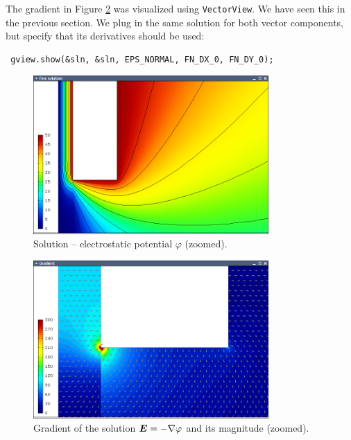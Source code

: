 \documentclass[11pt]{article}
\newcommand{\bfE}{\mbox{\boldmath $E$}}
\begin{document}
The gradient in Figure \ref{fig:motor-grad} was visualized using {\tt VectorView}. We have
seen this in the previous section. We plug in the same solution for both vector
components, but specify that its derivatives should be used:
\begin{lstlisting}
 gview.show(&sln, &sln, EPS_NORMAL, FN_DX_0, FN_DY_0);
\end{lstlisting}


\begin{figure}[!ht]
  \medskip \centering
  \includegraphics[width=0.8\textwidth]{img/motor-sln.png}
  \caption{Solution -- electrostatic potential $\varphi$ (zoomed).}
  \label{fig:motor-sln}
\end{figure}

\begin{figure}[!ht]
  \medskip \centering
  \includegraphics[width=0.8\textwidth]{img/motor-grad.png}
  \caption{Gradient of the solution $\bfE = -\nabla\varphi$ and its magnitude (zoomed).}
  \label{fig:motor-grad}
\end{figure}
\end{document}
